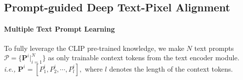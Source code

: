 \documentclass[nohyperref]{article}
\newcommand{\bs}{\boldsymbol}
\newcommand{\mbf}{\mathbf}
\theoremstyle{plain}
\theoremstyle{definition}
\theoremstyle{remark}
\begin{document}
\subsection{Prompt-guided Deep Text-Pixel Alignment}

 \paragraph{Multiple Text Prompt Learning}

 To fully leverage the CLIP pre-trained knowledge, we make $N$ text prompts $\mathcal{P} = \{\bs{P}^{i}|^N_{i=1}\}$ as only trainable context tokens from the text encoder module. \textit{i.e.,} $\bs{P}^i =[P^i_1,P^i_2, \cdots, P^i_l],$ where $l$ denotes the length of the context tokens. 
\end{document}
